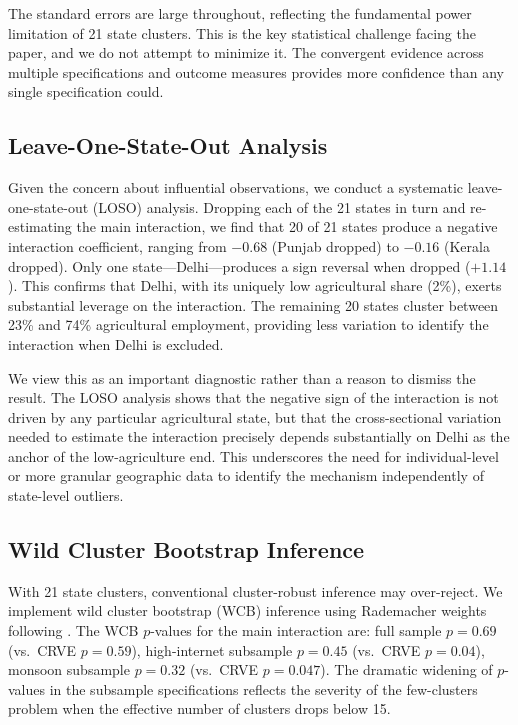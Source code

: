 \documentclass[12pt]{article}
\begin{document}
The standard errors are large throughout, reflecting the fundamental power limitation of 21 state clusters. This is the key statistical challenge facing the paper, and we do not attempt to minimize it. The convergent evidence across multiple specifications and outcome measures provides more confidence than any single specification could.

\subsection{Leave-One-State-Out Analysis}

Given the concern about influential observations, we conduct a systematic leave-one-state-out (LOSO) analysis. Dropping each of the 21 states in turn and re-estimating the main interaction, we find that 20 of 21 states produce a negative interaction coefficient, ranging from $-0.68$ (Punjab dropped) to $-0.16$ (Kerala dropped). Only one state---Delhi---produces a sign reversal when dropped ($+1.14$). This confirms that Delhi, with its uniquely low agricultural share (2\%), exerts substantial leverage on the interaction. The remaining 20 states cluster between 23\% and 74\% agricultural employment, providing less variation to identify the interaction when Delhi is excluded.

We view this as an important diagnostic rather than a reason to dismiss the result. The LOSO analysis shows that the negative sign of the interaction is not driven by any particular agricultural state, but that the cross-sectional variation needed to estimate the interaction precisely depends substantially on Delhi as the anchor of the low-agriculture end. This underscores the need for individual-level or more granular geographic data to identify the mechanism independently of state-level outliers.

\subsection{Wild Cluster Bootstrap Inference}

With 21 state clusters, conventional cluster-robust inference may over-reject. We implement wild cluster bootstrap (WCB) inference using Rademacher weights following \citet{cameron2008bootstrap}. The WCB $p$-values for the main interaction are: full sample $p = 0.69$ (vs.\ CRVE $p = 0.59$), high-internet subsample $p = 0.45$ (vs.\ CRVE $p = 0.04$), monsoon subsample $p = 0.32$ (vs.\ CRVE $p = 0.047$). The dramatic widening of $p$-values in the subsample specifications reflects the severity of the few-clusters problem when the effective number of clusters drops below 15.
\end{document}
